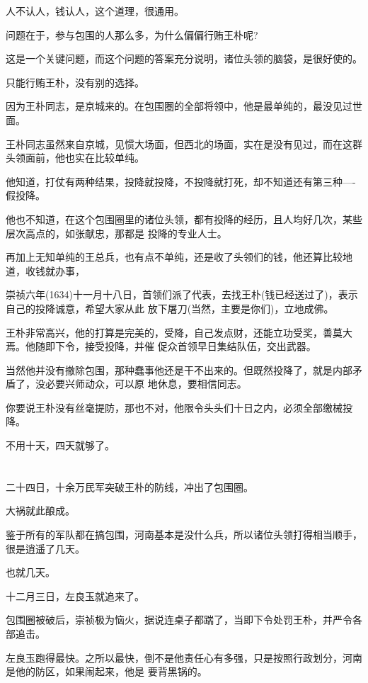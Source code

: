\documentclass[11pt,a4paper,onecolumn]{article}
\begin{document}
人不认人，钱认人，这个道理，很通用。

问题在于，参与包围的人那么多，为什么偏偏行贿王朴呢?

这是一个关键问题，而这个问题的答案充分说明，诸位头领的脑袋，是很好使的。

只能行贿王朴，没有别的选择。

因为王朴同志，是京城来的。在包围圈的全部将领中，他是最单纯的，最没见过世面。

王朴同志虽然来自京城，见惯大场面，但西北的场面，实在是没有见过，而在这群头领面前，他也实在比较单纯。

他知道，打仗有两种结果，投降就投降，不投降就打死，却不知道还有第三种----假投降。

他也不知道，在这个包围圈里的诸位头领，都有投降的经历，且人均好几次，某些层次高点的，如张献忠，那都是
投降的专业人士。

再加上无知单纯的王总兵，也有点不单纯，还是收了头领们的钱，他还算比较地道，收钱就办事，

崇祯六年(1634)十一月十八日，首领们派了代表，去找王朴(钱已经送过了)，表示自己的投降诚意，希望大家从此
放下屠刀(当然，主要是你们)，立地成佛。

王朴非常高兴，他的打算是完美的，受降，自己发点财，还能立功受奖，善莫大焉。他随即下令，接受投降，并催
促众首领早日集结队伍，交出武器。

当然他并没有撤除包围，那种蠢事他还是干不出来的。但既然投降了，就是内部矛盾了，没必要兴师动众，可以原
地休息，要相信同志。

你要说王朴没有丝毫提防，那也不对，他限令头头们十日之内，必须全部缴械投降。

不用十天，四天就够了。

\section[\thesection]{}

二十四日，十余万民军突破王朴的防线，冲出了包围圈。

大祸就此酿成。

鉴于所有的军队都在搞包围，河南基本是没什么兵，所以诸位头领打得相当顺手，很是逍遥了几天。

也就几天。

十二月三日，左良玉就追来了。

包围圈被破后，崇祯极为恼火，据说连桌子都踹了，当即下令处罚王朴，并严令各部追击。

左良玉跑得最快。之所以最快，倒不是他责任心有多强，只是按照行政划分，河南是他的防区，如果闹起来，他是
要背黑锅的。
\end{document}
